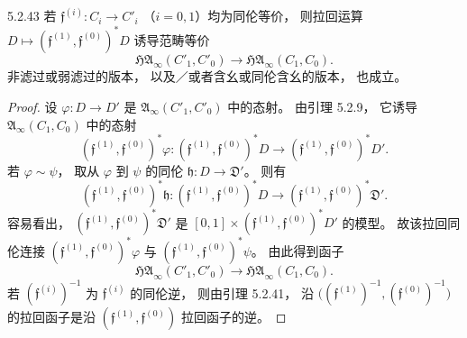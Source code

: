 \begin{proposition}{5.2.43}\label{prop:5-2-43}
若 $\mathfrak f^{(i)}:C_i\to C'_i$
（$i=0,1$）均为同伦等价，
则拉回运算
$D\mapsto
(\mathfrak f^{(1)},\mathfrak f^{(0)})^*D$
诱导范畴等价
\[
\mathfrak{HA}_\infty(C'_1,C'_0)
\longrightarrow
\mathfrak{HA}_\infty(C_1,C_0).
\]
非滤过或弱滤过的版本，
以及／或者含幺或同伦含幺的版本，
也成立。
\end{proposition}

\begin{proof}
设 $\varphi:D\to D'$ 是
$\mathfrak A_\infty(C'_1,C'_0)$
中的态射。
由引理 5.2.9，
它诱导
$\mathfrak A_\infty(C_1,C_0)$
中的态射
\[
(\mathfrak f^{(1)},\mathfrak f^{(0)})^*\varphi:
(\mathfrak f^{(1)},\mathfrak f^{(0)})^*D
\longrightarrow
(\mathfrak f^{(1)},\mathfrak f^{(0)})^*D'.
\]
若 $\varphi\sim\psi$，
取从 $\varphi$ 到 $\psi$ 的同伦
$\mathfrak h:D\to\mathfrak D'$。
则有
\[
(\mathfrak f^{(1)},\mathfrak f^{(0)})^*\mathfrak h:
(\mathfrak f^{(1)},\mathfrak f^{(0)})^*D
\longrightarrow
(\mathfrak f^{(1)},\mathfrak f^{(0)})^*\mathfrak D'.
\]
容易看出，
$(\mathfrak f^{(1)},\mathfrak f^{(0)})^*
\mathfrak D'$
是
$[0,1]\times
(\mathfrak f^{(1)},\mathfrak f^{(0)})^*D'$
的模型。
故该拉回同伦连接
$(\mathfrak f^{(1)},\mathfrak f^{(0)})^*\varphi$
与
$(\mathfrak f^{(1)},\mathfrak f^{(0)})^*\psi$。
由此得到函子
\[
\mathfrak{HA}_\infty(C'_1,C'_0)
\longrightarrow
\mathfrak{HA}_\infty(C_1,C_0).
\]
若 $(\mathfrak f^{(i)})^{-1}$
为 $\mathfrak f^{(i)}$ 的同伦逆，
则由引理 5.2.41，
沿
$\bigl((\mathfrak f^{(1)})^{-1},
(\mathfrak f^{(0)})^{-1}\bigr)$
的拉回函子是沿
$(\mathfrak f^{(1)},\mathfrak f^{(0)})$
拉回函子的逆。
\end{proof}

